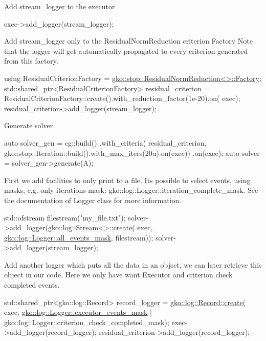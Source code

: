 Add stream\+\_\+logger to the executor


\begin{DoxyCode}
exec->add\_logger(stream\_logger);
\end{DoxyCode}


Add stream\+\_\+logger only to the Residual\+Norm\+Reduction criterion Factory Note that the logger will get automatically propagated to every criterion generated from this factory.


\begin{DoxyCode}
\textcolor{keyword}{using} ResidualCriterionFactory =
    \hyperlink{classgko_1_1stop_1_1ResidualNormReduction_1_1Factory}{gko::stop::ResidualNormReduction<>::Factory};
std::shared\_ptr<ResidualCriterionFactory> residual\_criterion =
    ResidualCriterionFactory::create().with\_reduction\_factor(1e-20).on(
        exec);
residual\_criterion->add\_logger(stream\_logger);
\end{DoxyCode}


Generate solver


\begin{DoxyCode}
\textcolor{keyword}{auto} solver\_gen =
    cg::build()
        .with\_criteria(
            residual\_criterion,
            gko::stop::Iteration::build().with\_max\_iters(20u).on(exec))
        .on(exec);
\textcolor{keyword}{auto} solver = solver\_gen->generate(A);
\end{DoxyCode}


First we add facilities to only print to a file. It\textquotesingle{}s possible to select events, using masks, e.\+g. only iterations mask\+: gko\+::log\+::\+Logger\+::iteration\+\_\+complete\+\_\+mask. See the documentation of Logger class for more information.


\begin{DoxyCode}
std::ofstream filestream(\textcolor{stringliteral}{"my\_file.txt"});
solver->add\_logger(\hyperlink{classgko_1_1log_1_1Stream}{gko::log::Stream<>::create}(
    exec, \hyperlink{classgko_1_1log_1_1Logger_a02534863a2d2f92dfeb2c39038365532}{gko::log::Logger::all\_events\_mask}, filestream));
solver->add\_logger(stream\_logger);
\end{DoxyCode}


Add another logger which puts all the data in an object, we can later retrieve this object in our code. Here we only have want Executor and criterion check completed events.


\begin{DoxyCode}
std::shared\_ptr<gko::log::Record> record\_logger = \hyperlink{classgko_1_1log_1_1Record_ab3863ff409b8ceaefa2f226a4e26debc}{gko::log::Record::create}(
    exec, \hyperlink{classgko_1_1log_1_1Logger_af263708ebb15007bc0086e7c438c190c}{gko::log::Logger::executor\_events\_mask} |
              gko::log::Logger::criterion\_check\_completed\_mask);
exec->add\_logger(record\_logger);
residual\_criterion->add\_logger(record\_logger);
\end{DoxyCode}


